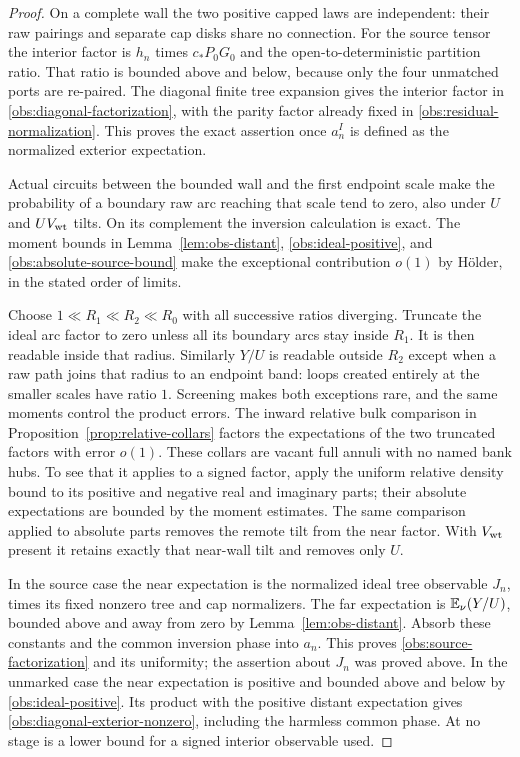 \begin{proof}
On a complete wall the two positive capped laws are independent:
their raw pairings and separate cap disks share no connection.
For the source tensor the interior factor is $h_n$ times
$c_*P_0G_0$ and the open-to-deterministic partition ratio.  That
ratio is bounded above and below, because only the four unmatched
ports are re-paired.  The diagonal finite tree expansion gives the
interior factor in \eqref{obs:diagonal-factorization}, with the
parity factor already fixed in \eqref{obs:residual-normalization}.
This proves the exact assertion once $a_n^I$ is defined as the
normalized exterior expectation.

Actual circuits between the bounded wall and the first endpoint
scale make the probability of a boundary raw arc reaching that
scale tend to zero, also under $U$ and $UV_{\rm wt}$ tilts.
On its complement the inversion calculation is exact.  The
moment bounds in Lemma~\ref{lem:obs-distant},
\eqref{obs:ideal-positive}, and
\eqref{obs:absolute-source-bound} make the exceptional contribution
$o(1)$ by H\"older, in the stated order of limits.

Choose $1\ll R_1\ll R_2\ll R_0$ with all successive ratios
diverging.  Truncate the ideal arc factor to zero unless all its
boundary arcs stay inside $R_1$.  It is then readable inside that
radius.  Similarly $Y/U$ is readable outside $R_2$ except when a
raw path joins that radius to an endpoint band: loops created
entirely at the smaller scales have ratio $1$.  Screening makes
both exceptions rare, and the same moments control the product
errors.  The inward relative bulk comparison in
Proposition~\ref{prop:relative-collars} factors the expectations
of the two truncated factors with error $o(1)$.  These collars are
vacant full annuli with no named bank hubs.  To see that it
applies to a signed factor, apply the uniform relative density
bound to its positive and negative real and imaginary parts;
their absolute expectations are bounded by the moment estimates.
The same comparison applied to absolute parts removes the remote
tilt from the near factor.  With $V_{\rm wt}$ present it retains
exactly that near-wall tilt and removes only $U$.

In the source case the near expectation is the normalized ideal
tree observable $J_n$, times its fixed nonzero tree and cap
normalizers.  The far expectation is $\mathbb E_\nu(Y/U)$, bounded
above and away from zero by Lemma~\ref{lem:obs-distant}.
Absorb these constants and the common inversion phase into
$a_n$.  This proves \eqref{obs:source-factorization} and its
uniformity; the assertion about $J_n$ was proved above.
In the unmarked case the near expectation is positive and
bounded above and below by \eqref{obs:ideal-positive}.  Its
product with the positive distant expectation gives
\eqref{obs:diagonal-exterior-nonzero}, including the harmless
common phase.  At no stage is a lower bound for a signed interior
observable used.
\end{proof}


